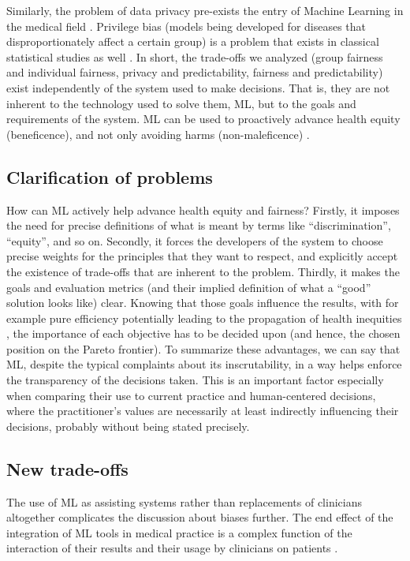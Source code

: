     Similarly, the problem of data privacy pre-exists the entry of Machine Learning in the medical field \cite[p.~346]{Dijkstra2020}.
    Privilege bias (models being developed for diseases that disproportionately affect a certain group) \cite[p.~5]{Rajkomar2018} is a problem that exists in classical statistical studies as well \cite{Jackson2019}.
    In short, the trade-offs we analyzed (group fairness and individual fairness, privacy and predictability, fairness and predictability) exist independently of the system used to make decisions.
    That is, they are not inherent to the technology used to solve them, ML, but to the goals and requirements of the system.
    ML can be used to proactively advance health equity (beneficence), and not only avoiding harms (non-maleficence) \cite[p.~2]{Rajkomar2018}.


\subsection{Clarification of problems}
    How can ML actively help advance health equity and fairness?
    Firstly, it imposes the need for precise definitions of what is meant by terms like ``discrimination'', ``equity'', and so on.
    Secondly, it forces the developers of the system to choose precise weights for the principles that they want to respect, and explicitly accept the existence of trade-offs that are inherent to the problem.
    Thirdly, it makes the goals and evaluation metrics (and their implied definition of what a ``good'' solution looks like) clear.
    Knowing that those goals influence the results, with for example pure efficiency potentially leading to the propagation of health inequities \cite[p.~2]{Rajkomar2018}, the importance of each objective has to be decided upon (and hence, the chosen position on the Pareto frontier).
    To summarize these advantages, we can say that ML, despite the typical complaints about its inscrutability, in a way helps enforce the transparency of the decisions taken.
    This is an important factor especially when comparing their use to current practice and human-centered decisions, where the practitioner's values are necessarily at least indirectly influencing their decisions, probably without being stated precisely.

\subsection{New trade-offs}
    The use of ML as assisting systems rather than replacements of clinicians altogether complicates the discussion about biases further.
    The end effect of the integration of ML tools in medical practice is a complex function of the interaction of their results and their usage by clinicians on patients \cite[p.~4]{Rajkomar2018}.


